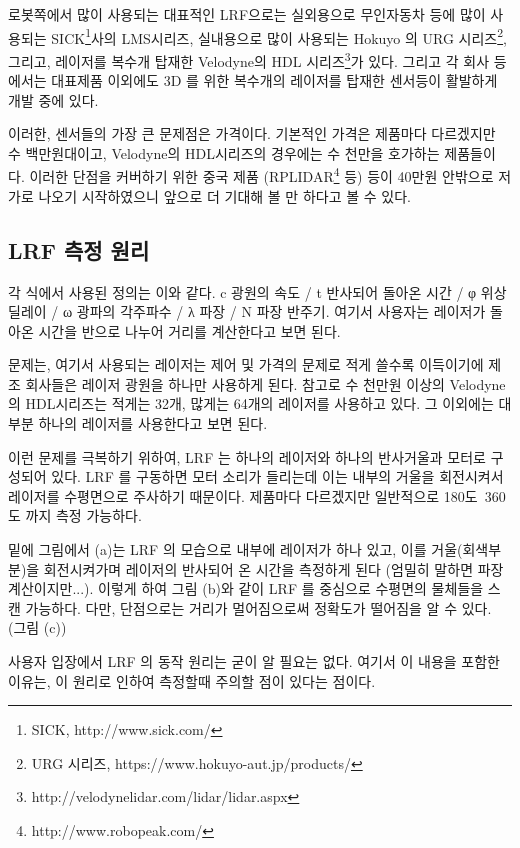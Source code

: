 로봇쪽에서 많이 사용되는 대표적인 LRF으로는 실외용으로 무인자동차 등에 많이 사용되는 SICK\footnote{SICK, http://www.sick.com/}사의 LMS시리즈, 실내용으로 많이 사용되는 Hokuyo 의 URG 시리즈\footnote{URG 시리즈, https://www.hokuyo-aut.jp/products/}, 그리고, 레이저를 복수개 탑재한 Velodyne의 HDL 시리즈\footnote{http://velodynelidar.com/lidar/lidar.aspx}가 있다. 그리고 각 회사 등에서는 대표제품 이외에도 3D 를 위한 복수개의 레이저를 탑재한 센서등이 활발하게 개발 중에 있다.

이러한, 센서들의 가장 큰 문제점은 가격이다. 기본적인 가격은 제품마다 다르겠지만 수 백만원대이고, Velodyne의 HDL시리즈의 경우에는 수 천만을 호가하는 제품들이다. 이러한 단점을 커버하기 위한 중국 제품 (RPLIDAR\footnote{http://www.robopeak.com/} 등) 등이 40만원 안밖으로 저가로 나오기 시작하였으니 앞으로 더 기대해 볼 만 하다고 볼 수 있다.

\subsection{LRF 측정 원리}

각 식에서 사용된 정의는 이와 같다. c 광원의 속도 / t 반사되어 돌아온 시간 / φ 위상 딜레이 / ω 광파의 각주파수 / λ 파장 / N 파장 반주기. 여기서 사용자는 레이저가 돌아온 시간을 반으로 나누어 거리를 계산한다고 보면 된다.

문제는, 여기서 사용되는 레이저는 제어 및 가격의 문제로 적게 쓸수록 이득이기에 제조 회사들은 레이저 광원을 하나만 사용하게 된다. 참고로 수 천만원 이상의 Velodyne의 HDL시리즈는 적게는 32개, 많게는 64개의 레이저를 사용하고 있다. 그 이외에는 대부분 하나의 레이저를 사용한다고 보면 된다. 

이런 문제를 극복하기 위하여, LRF 는 하나의 레이저와 하나의 반사거울과 모터로 구성되어 있다. LRF 를 구동하면 모터 소리가 들리는데 이는 내부의 거울을 회전시켜서 레이저를 수평면으로 주사하기 때문이다. 제품마다 다르겠지만 일반적으로 180도~360도 까지 측정 가능하다. 

밑에 그림에서 (a)는 LRF 의 모습으로 내부에 레이저가 하나 있고, 이를 거울(회색부분)을 회전시켜가며 레이저의 반사되어 온 시간을 측정하게 된다 (엄밀히 말하면 파장계산이지만...). 이렇게 하여 그림 (b)와 같이 LRF 를 중심으로 수평면의 물체들을 스캔 가능하다. 다만, 단점으로는 거리가 멀어짐으로써 정확도가 떨어짐을 알 수 있다. (그림 (c))

사용자 입장에서 LRF 의 동작 원리는 굳이 알 필요는 없다. 여기서 이 내용을 포함한 이유는, 이 원리로 인하여 측정할때 주의할 점이 있다는 점이다. 

